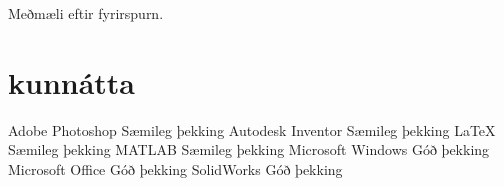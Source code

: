 \documentclass[]{friggeri-cv}
\begin{document}
Meðmæli eftir fyrirspurn.

\section{kunnátta}

\begin{entrylist}
  \entry
    {Adobe Photoshop}
    {Sæmileg þekking}
    {}
    {}
  \entry
    {Autodesk Inventor}
    {Sæmileg þekking}
    {}
    {}
  \entry
    {\LaTeX}
    {Sæmileg þekking}
    {}
    {}
  \entry
    {MATLAB}
    {Sæmileg þekking}
    {}
    {}
  \entry
    {Microsoft Windows}
    {Góð þekking}
    {}
    {}
  \entry
    {Microsoft Office}
    {Góð þekking}
    {}
    {}
  \entry
    {SolidWorks}
    {Góð þekking}
    {}
    {}
\end{entrylist}
\end{document}
